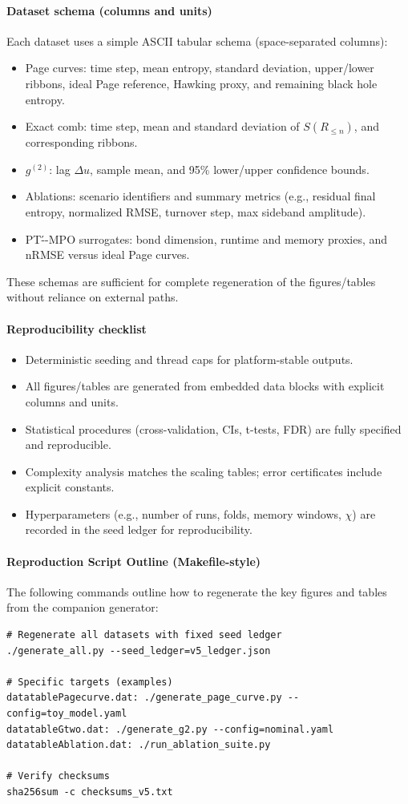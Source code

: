 \documentclass[a4paper,11pt]{article}
\newcommand{\eg}{e.g.\xspace}
\theoremstyle{plain}
\theoremstyle{definition}
\theoremstyle{remark}
\begin{document}
\paragraph{Dataset schema (columns and units)}
Each dataset uses a simple ASCII tabular schema (space-separated columns):
\begin{itemize}
  \item Page curves: time step, mean entropy, standard deviation, upper/lower ribbons, ideal Page reference, Hawking proxy, and remaining black hole entropy.
  \item Exact comb: time step, mean and standard deviation of $S(R_{\le n})$, and corresponding ribbons.
  \item $g^{(2)}$: lag $\Delta u$, sample mean, and 95\% lower/upper confidence bounds.
  \item Ablations: scenario identifiers and summary metrics (\eg, residual final entropy, normalized RMSE, turnover step, max sideband amplitude).
  \item PT\'--MPO surrogates: bond dimension, runtime and memory proxies, and nRMSE versus ideal Page curves.
\end{itemize}
These schemas are sufficient for complete regeneration of the figures/tables without reliance on external paths.

\paragraph{Reproducibility checklist}
\begin{itemize}
  \item Deterministic seeding and thread caps for platform-stable outputs.
  \item All figures/tables are generated from embedded data blocks with explicit columns and units.
  \item Statistical procedures (cross-validation, CIs, t-tests, FDR) are fully specified and reproducible.
  \item Complexity analysis matches the scaling tables; error certificates include explicit constants.
  \item Hyperparameters (\eg, number of runs, folds, memory windows, $\chi$) are recorded in the seed ledger for reproducibility.
\end{itemize}

\paragraph{Reproduction Script Outline (Makefile-style)}
The following commands outline how to regenerate the key figures and tables from the companion generator:
\begin{verbatim}
# Regenerate all datasets with fixed seed ledger
./generate_all.py --seed_ledger=v5_ledger.json

# Specific targets (examples)
datatablePagecurve.dat: ./generate_page_curve.py --config=toy_model.yaml
datatableGtwo.dat: ./generate_g2.py --config=nominal.yaml
datatableAblation.dat: ./run_ablation_suite.py

# Verify checksums
sha256sum -c checksums_v5.txt
\end{verbatim}
\end{document}

